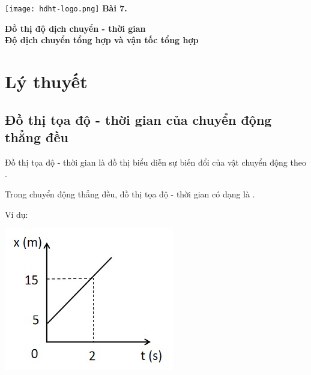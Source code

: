 \newcommand{\chapter}[2][]{
	\newcommand{\chapname}{#2}
	\begin{flushleft}
		\begin{minipage}[t]{\linewidth}
			\texttt{[image: hdht-logo.png]}
			\hspace{0pt}	
			\sffamily\bfseries\large Bài  7.
			\begin{flushleft}
				\LARGE\bfseries #1
			\end{flushleft}
		\end{minipage}
	\end{flushleft}
	\vspace{1cm}
	\normalfont\normalsize
}
\chapter[Đồ thị độ dịch chuyển - thời gian \\ Độ dịch chuyển tổng hợp và vận tốc tổng hợp]{Đồ thị độ dịch chuyển - thời gian \\ Độ dịch chuyển tổng hợp và vận tốc tổng hợp}
\section{Lý thuyết}
\subsection{Đồ thị tọa độ - thời gian của chuyển động thẳng đều}
Đồ thị tọa độ - thời gian là đồ thị biểu diễn sự biến đổi  của vật chuyển động theo .

Trong chuyển động thẳng đều, đồ thị tọa độ - thời gian có dạng là .

Ví dụ:
		\begin{center}
	\includegraphics[scale=0.6]{../figs/VN10-PH-03-L-002-4-V2-01.jpg}
\end{center}

